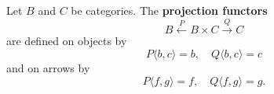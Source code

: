 Let $B$ and $C$ be categories. The \textbf{projection functors}
$$B \xleftarrow{P} B \times C \xrightarrow{Q} C$$
are defined on objects by
$$P\langle b, c \rangle = b, \quad Q\langle b, c \rangle = c$$
and on arrows by
$$P\langle f, g \rangle = f, \quad Q\langle f, g \rangle = g.$$

